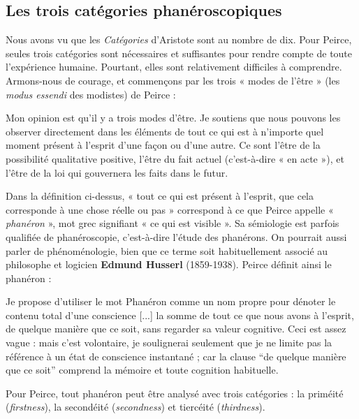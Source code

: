 \subsection{Les trois catégories phanéroscopiques}
Nous avons vu que les \textit{Catégories} d’Aristote sont au nombre de dix. Pour Peirce, seules trois catégories sont nécessaires et suffisantes pour rendre compte de toute l’expérience humaine. Pourtant, elles sont relativement difficiles à comprendre. Armons-nous de courage, et commençons par les trois « modes de l’être » (les \textit{modus essendi} des modistes) de Peirce :
\begin{lecture}{}
Mon opinion est qu’il y a trois modes d’être. Je soutiens que nous pouvons les observer directement dans les éléments de tout ce qui est à n’importe quel moment présent à l’esprit d’une façon ou d’une autre. Ce sont l’être de la possibilité qualitative positive, l’être du fait actuel (c’est-à-dire « en acte »), et l’être de la loi qui gouvernera les faits dans le futur.
\end{lecture}
Dans la définition ci-dessus, « tout ce qui est présent à l’esprit, que cela corresponde à une chose réelle ou pas » correspond à ce que Peirce appelle « \textit{phanéron} », mot grec signifiant « ce qui est visible ». Sa sémiologie est parfois qualifiée de phanéroscopie, c’est-à-dire l’étude des phanérons. On pourrait aussi parler de phénoménologie, bien que ce terme soit habituellement associé au philosophe et logicien \textbf{Edmund Husserl} (1859-1938). Peirce définit ainsi le phanéron :
\begin{lecture}{}
Je propose d’utiliser le mot Phanéron comme un nom propre pour dénoter le contenu total d’une conscience [...] la somme de tout ce que nous avons à l’esprit, de quelque manière que ce soit, sans regarder sa valeur cognitive. Ceci est assez vague : mais c’est volontaire, je soulignerai seulement que je ne limite pas la référence à un état de conscience instantané ; car la clause “de quelque manière que ce soit” comprend la mémoire et toute cognition habituelle.
\end{lecture}

Pour Peirce, tout phanéron peut être analysé avec trois catégories : la priméité (\textit{firstness}), la secondéité (\textit{secondness}) et tiercéité (\textit{thirdness}).

